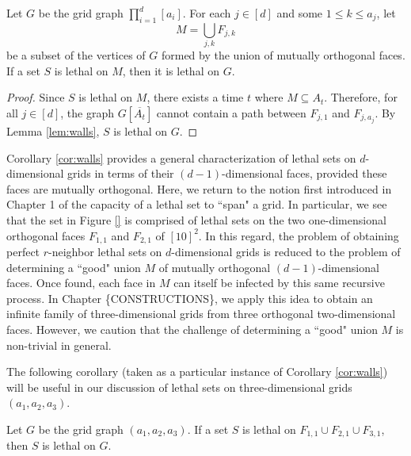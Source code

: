 \begin{cor}
\label{cor:walls}
Let $G$ be the grid graph $\prod_{i=1}^d [a_i]$. For each $j \in [d]$ and some $1 \leq k \leq a_j$, let 
$$M = \bigcup_{j,k} F_{j,k}$$
be a subset of the vertices of $G$ formed by the union of mutually orthogonal faces. If a set $S$ is lethal on $M$, then it is lethal on $G$. 
\end{cor}

\begin{proof}
Since $S$ is lethal on $M$, there exists a time $t$ where $M \subseteq A_t$. Therefore, for all $j \in [d]$, the graph $G[\overline{A_t}]$ cannot contain a path between $F_{j,1}$ and $F_{j,a_j}$. By Lemma \ref{lem:walls}, $S$ is lethal on $G$. 
\end{proof}

Corollary \ref{cor:walls} provides a general characterization of lethal sets on $d$-dimensional grids in terms of their $(d-1)$-dimensional faces, provided these faces are mutually orthogonal. Here, we return to the notion first introduced in Chapter 1 of the capacity of a lethal set to ``span" a grid. In particular, we see that the set in Figure \ref{} is comprised of lethal sets on the two one-dimensional orthogonal faces $F_{1,1}$ and $F_{2,1}$ of $[10]^2$. In this regard, the problem of obtaining perfect $r$-neighbor lethal sets on $d$-dimensional grids is reduced to the problem of determining a ``good" union $M$ of mutually orthogonal $(d-1)$-dimensional faces. Once found, each face in $M$ can itself be infected by this same recursive process. In Chapter \{CONSTRUCTIONS\}, we apply this idea to obtain an infinite family of three-dimensional grids from three orthogonal two-dimensional faces. However, we caution that the challenge of determining a ``good" union $M$ is non-trivial in general.

The following corollary (taken as a particular instance of Corollary \ref{cor:walls}) will be useful in our discussion of lethal sets on three-dimensional grids $(a_1,a_2,a_3)$. 

\begin{cor}
\label{cor:three_walls}
Let $G$ be the grid graph $(a_1,a_2,a_3)$. If a set $S$ is lethal on $F_{1,1} \cup F_{2,1} \cup F_{3,1}$, then $S$ is lethal on $G$.
\end{cor}

